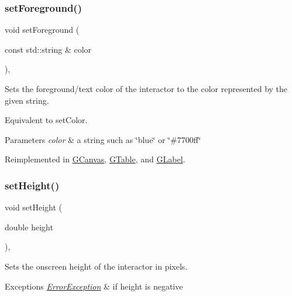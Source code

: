 \subsubsection{\texorpdfstring{set\+Foreground()}{setForeground()}\hspace{0.1cm}{\footnotesize\ttfamily [2/2]}}
{\footnotesize\ttfamily void set\+Foreground (\begin{DoxyParamCaption}\item[{const std\+::string \&}]{color }\end{DoxyParamCaption})\hspace{0.3cm}{\ttfamily [virtual]}, {\ttfamily [inherited]}}



Sets the foreground/text color of the interactor to the color represented by the given string. 

Equivalent to set\+Color. 
\begin{DoxyParams}{Parameters}
{\em color} & a string such as \char`\"{}blue\char`\"{} or \char`\"{}\#7700ff\char`\"{} \\
\hline
\end{DoxyParams}


Reimplemented in \mbox{\hyperlink{classGCanvas_a088e04dfc56273df4cedab2b11b970f5}{G\+Canvas}}, \mbox{\hyperlink{classGTable_a088e04dfc56273df4cedab2b11b970f5}{G\+Table}}, and \mbox{\hyperlink{classGLabel_a088e04dfc56273df4cedab2b11b970f5}{G\+Label}}.

\mbox{\label{classGInteractor_a9e280bfc4544dfaf8e4376c4e1a74357}} 
\subsubsection{\texorpdfstring{set\+Height()}{setHeight()}}
{\footnotesize\ttfamily void set\+Height (\begin{DoxyParamCaption}\item[{double}]{height }\end{DoxyParamCaption})\hspace{0.3cm}{\ttfamily [virtual]}, {\ttfamily [inherited]}}



Sets the onscreen height of the interactor in pixels. 


\begin{DoxyExceptions}{Exceptions}
{\em \mbox{\hyperlink{classErrorException}{Error\+Exception}}} & if height is negative \\
\hline
\end{DoxyExceptions}


